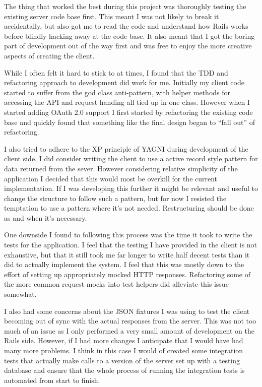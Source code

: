 \documentclass[paper=a4, fontsize=11pt]{scrartcl}	%
\numberwithin{equation}{section}															%
\numberwithin{figure}{section}																%
\numberwithin{table}{section}
\begin{document}
The thing that worked the best during this project was thoroughly testing the existing server code base first. This meant I was not likely to break it accidentally, but also got me to read the code and understand how Rails works before blindly hacking away at the code base. It also meant that I got the boring part of development out of the way first and was free to enjoy the more creative aspects of creating the client.

While I often felt it hard to stick to at times, I found that the TDD and refactoring approach to development did work for me. Initially my client code started to suffer from the god class anti-pattern, with helper methods for accessing the API and request handing all tied up in one class. However when I started adding OAuth 2.0 support I first started by refactoring the existing code base and quickly found that something like the final design began to ``fall out'' of refactoring. 

I also tried to adhere to the XP principle of YAGNI during development of the client side. I did consider writing the client to use a active record style pattern for data returned from the sever. However considering relative simplicity of the application I decided that this would most be overkill for the current implementation. If I was developing this further it might be relevant and useful to change the structure to follow such a pattern, but for now I resisted the temptation to use a pattern where it's not needed. Restructuring should be done as and when it's necessary.

One downside I found to following this process was the time it took to write the tests for the application. I feel that the testing I have provided in the client is not exhaustive, but that it still took me far longer to write half decent tests than it did to actually implement the system. I feel that this was mostly down to the effort of setting up appropriately mocked HTTP responses. Refactoring some of the more common request mocks into test helpers did alleviate this issue somewhat. 

I also had some concerns about the JSON fixtures I was using to test the client becoming out of sync with the actual responses from the server. This was not too much of an issue as I only performed a very small amount of development on the Rails side. However, if I had more changes I anticipate that I would have had many more problems. I think in this case I would of created some integration tests that actually make calls to a version of the server set up with a testing database and ensure that the whole process of running the integration tests is automated from start to finish. 
\end{document}
